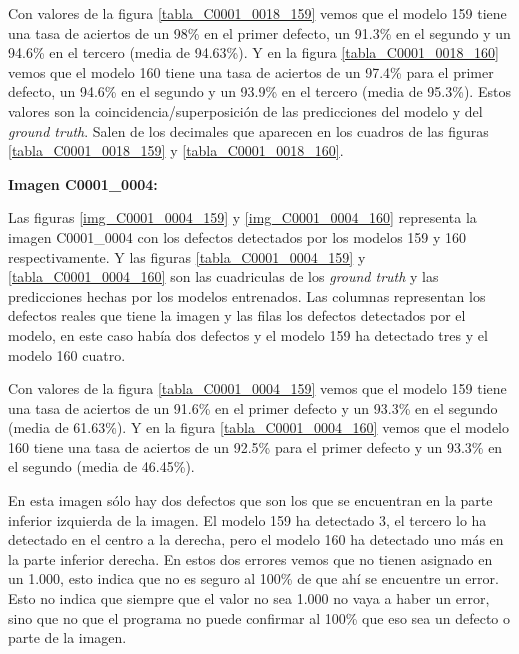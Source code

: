 Con valores de la figura \ref{tabla_C0001_0018_159} vemos que el modelo 159 tiene una tasa de aciertos de un 98\% en el primer defecto, un 91.3\% en el segundo y un 94.6\% en el tercero (media de 94.63\%). Y en la figura \ref{tabla_C0001_0018_160} vemos que el modelo 160 tiene una tasa de aciertos de un 97.4\% para el primer defecto, un 94.6\% en el segundo y un 93.9\% en el tercero (media de 95.3\%). Estos valores son la coincidencia/superposición de las predicciones del modelo y del \textit{ground truth}. Salen de los decimales que aparecen en los cuadros de las figuras \ref{tabla_C0001_0018_159} y \ref{tabla_C0001_0018_160}.

 \textbf{Imagen C0001\_0004:}





Las figuras \ref{img_C0001_0004_159} y \ref{img_C0001_0004_160} representa la imagen C0001\_0004 con los defectos detectados por los modelos 159 y 160 respectivamente. Y las figuras \ref{tabla_C0001_0004_159} y \ref{tabla_C0001_0004_160} son las cuadriculas de los \textit{ground truth} y las predicciones hechas por los modelos entrenados. Las columnas representan los defectos reales que tiene la imagen y las filas los defectos detectados por el modelo, en este caso había dos defectos y el modelo 159 ha detectado tres y el modelo 160 cuatro.

Con valores de la figura \ref{tabla_C0001_0004_159} vemos que el modelo 159 tiene una tasa de aciertos de un 91.6\% en el primer defecto y un 93.3\% en el segundo (media de 61.63\%). Y en la figura \ref{tabla_C0001_0004_160} vemos que el modelo 160 tiene una tasa de aciertos de un 92.5\% para el primer defecto y un 93.3\% en el segundo (media de 46.45\%).

En esta imagen sólo hay dos defectos que son los que se encuentran en la parte inferior izquierda de la imagen. El modelo 159 ha detectado 3, el tercero lo ha detectado en el centro a la derecha, pero el modelo 160 ha detectado uno más en la parte inferior derecha. En estos dos errores vemos que no tienen asignado en un 1.000, esto indica que no es seguro al 100\% de que ahí se encuentre un error. Esto no indica que siempre que el valor no sea 1.000 no vaya a haber un error, sino que no que el programa no puede confirmar al 100\% que eso sea un defecto o parte de la imagen.

